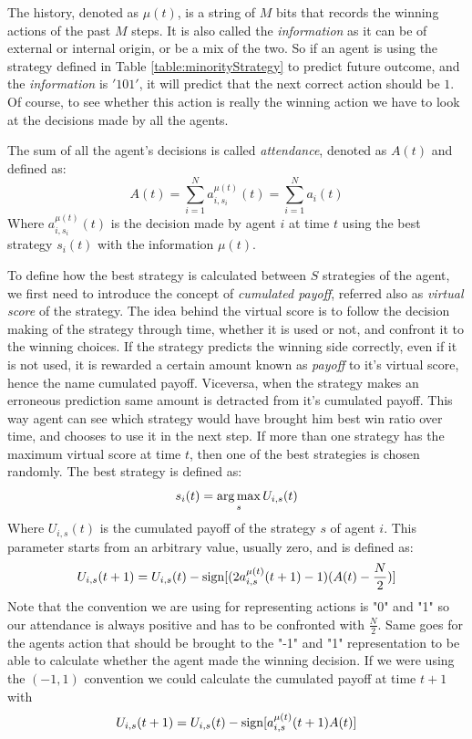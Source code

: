 The history, denoted as $\mu(t)$, is a string of $M$ bits that records the winning actions of the past $M$ steps.
It is also called the \textit{information} as it can be of external or internal origin, or be a mix of the two.
So if an agent is using the strategy defined in Table \ref{table:minorityStrategy} to predict future outcome, and the \textit{information} is $'101'$, it will predict that the next correct action should be $1$.
Of course, to see whether this action is really the winning action we have to look at the decisions made by all the agents.

The sum of all the agent's decisions is called \textit{attendance}, denoted as $A(t)$ and defined as:
\begin{displaymath}
A(t)=\sum_{i=1}^N a_{i,s_i}^{\mu(t)}(t) = \sum_{i=1}^N a_i(t)
\end{displaymath}
Where $a_{i,s_i}^{\mu(t)}(t)$ is the decision made by agent $i$ at time $t$ using the best strategy $s_i(t)$ with the information $\mu(t)$.

To define how the best strategy is calculated between $S$ strategies of the agent, we first need to introduce the concept of \textit{cumulated payoff}, referred also as \textit{virtual score }of the strategy. 
The idea behind the virtual score is to follow the decision making of the strategy through time, whether it is used or not, and confront it to the winning choices.
If the strategy predicts the winning side correctly, even if it is not used, it is rewarded a certain amount known as \textit{payoff} to it's virtual score, hence the name cumulated payoff.
Viceversa, when the strategy makes an erroneous prediction same amount is detracted from it's cumulated payoff.
This way agent can see which strategy would have brought him best win ratio over time, and chooses to use it in the next step. 
If more than one strategy has the maximum virtual score at time $t$, then one of the best strategies is chosen randomly.
The best strategy is defined as:
\begin{displaymath}
s_i(t) = \operatorname*{arg\,max}_s U_{i,s}(t)
\end{displaymath}
Where $U_{i,s}(t)$ is the cumulated payoff of the strategy $s$ of agent $i$.
This parameter starts from an arbitrary value, usually zero, and is defined as:
\begin{displaymath}
U_{i,s}(t+1) = U_{i,s}(t) -  \operatorname{sign}[( 2 a_{i,s}^{\mu(t)}(t+1) - 1 )(A(t) - \frac{N}{2}  )]
\end{displaymath}
Note that the convention we are using for representing actions is "0" and "1" so our attendance is always positive and has to be confronted with $\frac{N}{2}$.
Same goes for the agents action that should be brought to the "-1" and "1" representation to be able to calculate whether the agent made the winning decision.
If we were using the $(-1,1)$ convention we could calculate the cumulated payoff at time $t+1$ with
\begin{displaymath}
U_{i,s}(t+1) = U_{i,s}(t) -  \operatorname{sign}[a_{i,s}^{\mu(t)}(t+1) A(t) ]
\end{displaymath}

